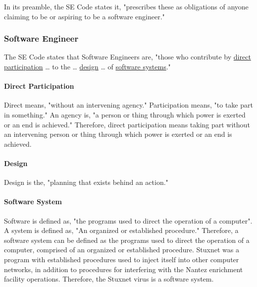 \documentclass[12pt]{article}
\begin{document}
\begin{multicols}{2}
In its preamble, the SE Code states it, "prescribes these as obligations of anyone claiming to be or aspiring to be a software engineer."\cite{softwareEngineeringCodeOfEthics}

\subsubsection{Software Engineer}

The SE Code states that Software Engineers are, "those who contribute by \underline{direct participation} … to the … \underline{design} … of \underline{software systems}."\cite{softwareEngineeringCodeOfEthics}

\paragraph{Direct Participation}

Direct means, "without an intervening agency."\cite{merriamWebsterDefinitions} Participation means, "to take part in something."\cite{cambridgeDictionary} An agency is, "a person or thing through which power is exerted or an end is achieved."\cite{merriamWebsterDefinitions} Therefore, direct participation means taking part without an intervening person or thing through which power is exerted or an end is achieved.

\paragraph{Design}

Design is the, "planning that exists behind an action."\cite{oxfordDictionary}

\paragraph{Software System}

Software is defined as, "the programs used to direct the operation of a computer".\cite{softwareDefinition} A system is defined as, "An organized or established procedure."\cite{merriamWebsterDefinitions} Therefore, a software system can be defined as the programs used to direct the operation of a computer, comprised of an organized or established procedure. Stuxnet was a program with established procedures used to inject itself into other computer networks, in addition to procedures for interfering with the Nantez enrichment facility operations. Therefore, the Stuxnet virus is a software system.\cite{w32.stuxnetDossier}


\end{multicols}
\end{document}
